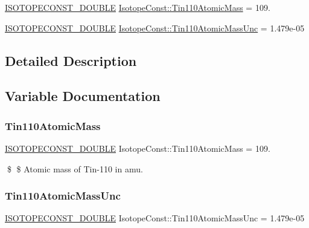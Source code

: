 \begin{DoxyCompactItemize}
\item 
\mbox{\hyperlink{group___isotope_const-_macros_ga8f45a7272ce02c0b4c65c44636ed719a}{I\+S\+O\+T\+O\+P\+E\+C\+O\+N\+S\+T\+\_\+\+D\+O\+U\+B\+LE}} \mbox{\hyperlink{group___isotope_const-_tin-_sn110_ga5e9e9c13ccdc1c99da54ac7f1966078f}{Isotope\+Const\+::\+Tin110\+Atomic\+Mass}} = 109.
\item 
\mbox{\hyperlink{group___isotope_const-_macros_ga8f45a7272ce02c0b4c65c44636ed719a}{I\+S\+O\+T\+O\+P\+E\+C\+O\+N\+S\+T\+\_\+\+D\+O\+U\+B\+LE}} \mbox{\hyperlink{group___isotope_const-_tin-_sn110_ga1065e834704b0707bd008c286df3981b}{Isotope\+Const\+::\+Tin110\+Atomic\+Mass\+Unc}} = 1.\+479e-\/05
\end{DoxyCompactItemize}


\subsection{Detailed Description}


\subsection{Variable Documentation}
\mbox{\label{group___isotope_const-_tin-_sn110_ga5e9e9c13ccdc1c99da54ac7f1966078f}} 
\subsubsection{\texorpdfstring{Tin110\+Atomic\+Mass}{Tin110AtomicMass}}
{\footnotesize\ttfamily \mbox{\hyperlink{group___isotope_const-_macros_ga8f45a7272ce02c0b4c65c44636ed719a}{I\+S\+O\+T\+O\+P\+E\+C\+O\+N\+S\+T\+\_\+\+D\+O\+U\+B\+LE}} Isotope\+Const\+::\+Tin110\+Atomic\+Mass = 109.}

\$ \$ Atomic mass of Tin-\/110 in amu. \mbox{\label{group___isotope_const-_tin-_sn110_ga1065e834704b0707bd008c286df3981b}} 
\subsubsection{\texorpdfstring{Tin110\+Atomic\+Mass\+Unc}{Tin110AtomicMassUnc}}
{\footnotesize\ttfamily \mbox{\hyperlink{group___isotope_const-_macros_ga8f45a7272ce02c0b4c65c44636ed719a}{I\+S\+O\+T\+O\+P\+E\+C\+O\+N\+S\+T\+\_\+\+D\+O\+U\+B\+LE}} Isotope\+Const\+::\+Tin110\+Atomic\+Mass\+Unc = 1.\+479e-\/05}

